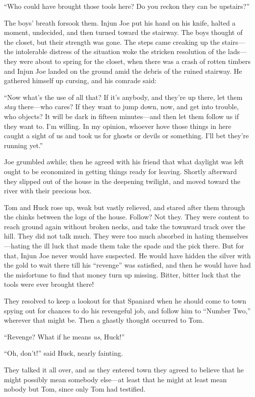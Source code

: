 \documentclass{book}
\begin{document}
“Who could have brought those tools here? Do you reckon they can be upstairs?”

The boys’ breath forsook them. Injun Joe put his hand on his knife, halted a moment, undecided, and then turned toward the stairway. The boys thought of the closet, but their strength was gone. The steps came creaking up the stairs—the intolerable distress of the situation woke the stricken resolution of the lads—they were about to spring for the closet, when there was a crash of rotten timbers and Injun Joe landed on the ground amid the debris of the ruined stairway. He gathered himself up cursing, and his comrade said:

“Now what’s the use of all that? If it’s anybody, and they’re up there, let them \emph{stay} there—who cares? If they want to jump down, now, and get into trouble, who objects? It will be dark in fifteen minutes—and then let them follow us if they want to. I’m willing. In my opinion, whoever hove those things in here caught a sight of us and took us for ghosts or devils or something. I’ll bet they’re running yet.”

Joe grumbled awhile; then he agreed with his friend that what daylight was left ought to be economized in getting things ready for leaving. Shortly afterward they slipped out of the house in the deepening twilight, and moved toward the river with their precious box.

Tom and Huck rose up, weak but vastly relieved, and stared after them through the chinks between the logs of the house. Follow? Not they. They were content to reach ground again without broken necks, and take the townward track over the hill. They did not talk much. They were too much absorbed in hating themselves—hating the ill luck that made them take the spade and the pick there. But for that, Injun Joe never would have suspected. He would have hidden the silver with the gold to wait there till his “revenge” was satisfied, and then he would have had the misfortune to find that money turn up missing. Bitter, bitter luck that the tools were ever brought there!

They resolved to keep a lookout for that Spaniard when he should come to town spying out for chances to do his revengeful job, and follow him to “Number Two,” wherever that might be. Then a ghastly thought occurred to Tom.

“Revenge? What if he means \emph{us}, Huck!”

“Oh, don’t!” said Huck, nearly fainting.

They talked it all over, and as they entered town they agreed to believe that he might possibly mean somebody else—at least that he might at least mean nobody but Tom, since only Tom had testified.
\end{document}
